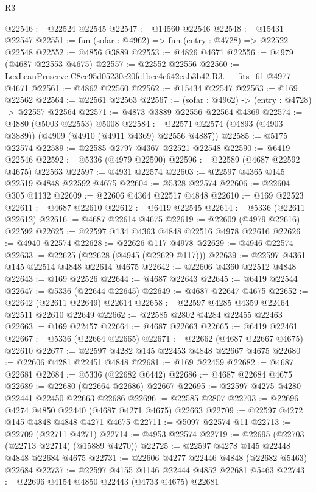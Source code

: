 \begin{lexlean}{R3}
\begin{coremodule}
@22546 := @22524 @22545
@22547 := @14560 @22546
@22548 := @15431 @22547
@22551 := fun (sofar : @4962) => fun (entry : @4728) => @22522 @22548
@22552 := @4856 @3889
@22553 := @4826 @4671
@22556 := @4979 (@4687 @22553 @4675)
@22557 := @22552 @22556
@22560 := LexLeanPreserve.C8ce95d05230c20fe1bec4c642eab3b42.R3.__fits_61 @4977 @4671
@22561 := @4862 @22560
@22562 := @15434 @22547
@22563 := @169 @22562
@22564 := @22561 @22563
@22567 := (sofar : @4962) -> (entry : @4728) -> @22557 @22564
@22571 := @4873 @3889 @22556 @22564 @4369
@22574 := @4880 (@5003 @22553) @5008
@22584 := @22571 @22574 (@4893 (@4903 @3889)) (@4909 (@4910 (@4911 @4369) @22556 @4887))
@22585 := @5175 @22574
@22589 := @22585 @2797 @4367 @22521 @22548
@22590 := @6419 @22546
@22592 := @5336 (@4979 @22590)
@22596 := @22589 (@4687 @22592 @4675) @22563
@22597 := @4931 @22574
@22603 := @22597 @4365 @145 @22519 @4848 @22592 @4675
@22604 := @5328 @22574
@22606 := @22604 @305 @1132
@22609 := @22606 @4364 @22517 @4848
@22610 := @169 @22523
@22611 := @4687 @22610
@22612 := @6419 @22545
@22614 := @5336 (@22611 @22612)
@22616 := @4687 @22614 @4675
@22619 := @22609 (@4979 @22616) @22592
@22625 := @22597 @134 @4363 @4848 @22516 @4978 @22616
@22626 := @4940 @22574
@22628 := @22626 @117 @4978
@22629 := @4946 @22574
@22633 := @22625 (@22628 (@4945 (@22629 @117)))
@22639 := @22597 @4361 @145 @22514 @4848 @22614 @4675
@22642 := @22606 @4360 @22512 @4848
@22643 := @169 @22526
@22644 := @4687 @22643
@22645 := @6419 @22544
@22647 := @5336 (@22644 @22645)
@22649 := @4687 @22647 @4675
@22652 := @22642 (@22611 @22649) @22614
@22658 := @22597 @4285 @4359 @22464 @22511 @22610 @22649
@22662 := @22585 @2802 @4284 @22455 @22463
@22663 := @169 @22457
@22664 := @4687 @22663
@22665 := @6419 @22461
@22667 := @5336 (@22664 @22665)
@22671 := @22662 (@4687 @22667 @4675) @22610
@22677 := @22597 @4282 @145 @22453 @4848 @22667 @4675
@22680 := @22606 @4281 @22451 @4848
@22681 := @169 @22459
@22682 := @4687 @22681
@22684 := @5336 (@22682 @6442)
@22686 := @4687 @22684 @4675
@22689 := @22680 (@22664 @22686) @22667
@22695 := @22597 @4275 @4280 @22441 @22450 @22663 @22686
@22696 := @22585 @2807
@22703 := @22696 @4274 @4850 @22440 (@4687 @4271 @4675) @22663
@22709 := @22597 @4272 @145 @4848 @4848 @4271 @4675
@22711 := @5097 @22574 @11
@22713 := @22709 (@22711 @4271)
@22714 := @4953 @22574
@22719 := @22695 (@22703 (@22713 @22714) (@15889 @4270))
@22725 := @22597 @4278 @145 @22448 @4848 @22684 @4675
@22731 := @22606 @4277 @22446 @4848 (@22682 @5463) @22684
@22737 := @22597 @4155 @1146 @22444 @4852 @22681 @5463
@22743 := @22696 @4154 @4850 @22443 (@4733 @4675) @22681

\end{coremodule}
\end{lexlean}
